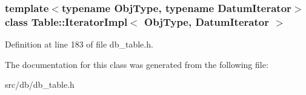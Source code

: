 \subsubsection*{template$<$typename Obj\+Type, typename Datum\+Iterator$>$\newline
class Table\+::\+Iterator\+Impl$<$ Obj\+Type, Datum\+Iterator $>$}



Definition at line 183 of file db\+\_\+table.\+h.



The documentation for this class was generated from the following file\+:\begin{DoxyCompactItemize}
\item 
src/db/db\+\_\+table.\+h\end{DoxyCompactItemize}
